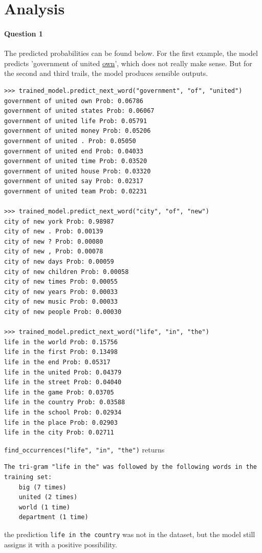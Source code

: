 \documentclass{article}
\begin{document}
    \section{Analysis}
    \paragraph{Question 1} The predicted probabilities can be found below. For the first example, the model predicts 'government of united \ul{own}', which does not really make sense. But for the second and third trails, the model produces sensible outputs. 
    \begin{lstlisting}
>>> trained_model.predict_next_word("government", "of", "united")
government of united own Prob: 0.06786
government of united states Prob: 0.06067
government of united life Prob: 0.05791
government of united money Prob: 0.05206
government of united . Prob: 0.05050
government of united end Prob: 0.04033
government of united time Prob: 0.03520
government of united house Prob: 0.03320
government of united say Prob: 0.02317
government of united team Prob: 0.02231

>>> trained_model.predict_next_word("city", "of", "new")
city of new york Prob: 0.98987
city of new . Prob: 0.00139
city of new ? Prob: 0.00080
city of new , Prob: 0.00078
city of new days Prob: 0.00059
city of new children Prob: 0.00058
city of new times Prob: 0.00055
city of new years Prob: 0.00033
city of new music Prob: 0.00033
city of new people Prob: 0.00030

>>> trained_model.predict_next_word("life", "in", "the")
life in the world Prob: 0.15756
life in the first Prob: 0.13498
life in the end Prob: 0.05317
life in the united Prob: 0.04379
life in the street Prob: 0.04040
life in the game Prob: 0.03705
life in the country Prob: 0.03588
life in the school Prob: 0.02934
life in the place Prob: 0.02903
life in the city Prob: 0.02711
    \end{lstlisting}
    \texttt{find\_occurrences("life", "in", "the")} returns
    \begin{lstlisting}
The tri-gram "life in the" was followed by the following words in the training set:
    big (7 times)
    united (2 times)
    world (1 time)
    department (1 time)
    \end{lstlisting}
    the prediction \texttt{life in the country} was not in the dataset, but the model still assigns it with a positive possibility.
   
\end{document}
